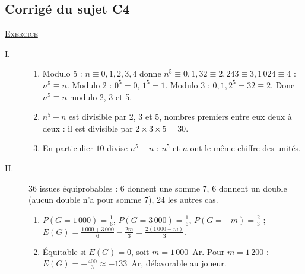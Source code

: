 \begin{corrige}
\subsection{Corrig\'e du sujet C4}
\noindent \underline{\textsc{Exercice}}
\begin{description}
\item[I.] \begin{enumerate}
      \item Modulo 5 : $n \equiv 0, 1, 2, 3, 4$ donne $n^5 \equiv 0, 1, 32 \equiv 2, 243 \equiv 3, 1\,024 \equiv 4$ : $n^5 \equiv n$.
            Modulo 2 : $0^5 = 0$, $1^5 = 1$. Modulo 3 : $0, 1, 2^5 = 32 \equiv 2$. Donc $n^5 \equiv n$ modulo 2, 3 et 5.
      \item $n^5 - n$ est divisible par 2, 3 et 5, nombres premiers entre eux deux \`a deux : il est divisible par $2 \times 3 \times 5 = 30$.
      \item En particulier $10$ divise $n^5 - n$ : $n^5$ et $n$ ont le m\^eme chiffre des unit\'es.
      \end{enumerate}
\item[II.] 36 issues \'equiprobables : 6 donnent une somme 7, 6 donnent un double (aucun double n'a pour somme 7), 24 les autres cas.
      \begin{enumerate}
      \item $P(G = 1\,000) = \frac{1}{6}$, $P(G = 3\,000) = \frac{1}{6}$, $P(G = -m) = \frac{2}{3}$ ;
            $E(G) = \frac{1\,000 + 3\,000}{6} - \frac{2m}{3} = \frac{2(1\,000 - m)}{3}$.
      \item \'Equitable si $E(G) = 0$, soit $m = 1\,000$~Ar. Pour $m = 1\,200$ : $E(G) = -\frac{400}{3} \approx -133$~Ar, d\'efavorable au joueur.
      \end{enumerate}
\end{description}


\end{corrige}
